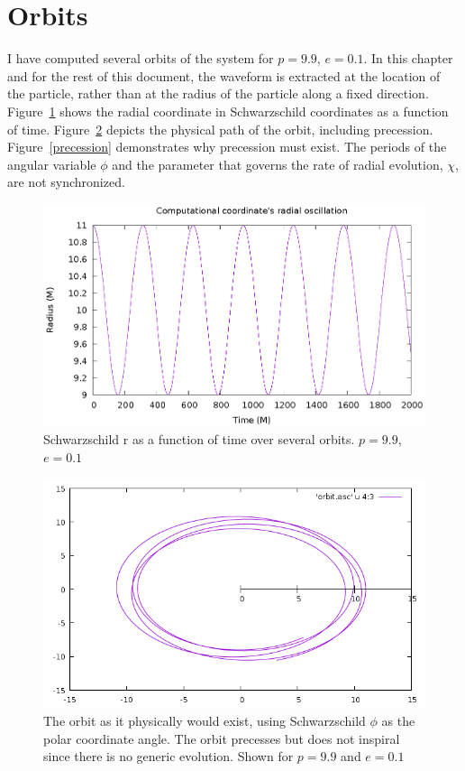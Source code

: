 \section{Orbits}

I have computed several orbits of the system for $p=9.9$, $e=0.1$. In this chapter and for the rest of this document, the waveform is extracted at the location of the particle, rather than at the radius of the particle along a fixed direction. Figure~\ref{rorb} shows the radial coordinate in Schwarzschild coordinates as a function of time. Figure~\ref{phiorb} depicts the physical path of the orbit, including precession. Figure~\ref{precession} demonstrates why precession must exist. The periods of the angular variable $\phi$ and the parameter that governs the rate of radial evolution, $\chi$, are not synchronized.

\begin{figure}
  \includegraphics{orbit}
  \caption{Schwarzschild r as a function of time over several orbits. $p=9.9$, $e=0.1$}
  \label{rorb}
\end{figure}


\begin{figure}
  \includegraphics{orbitevolvedg44p99e01}
  \caption{The orbit as it physically would exist, using Schwarzschild $\phi$ as the polar coordinate angle. The orbit precesses but does not inspiral since there is no generic evolution. Shown for $p=9.9$ and $e=0.1$}
  \label{phiorb}
\end{figure}



